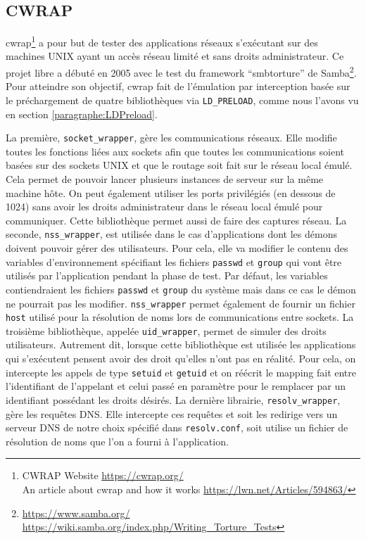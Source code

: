 \subsection{CWRAP}
\label{subsection:cwrap}

cwrap\footnote{CWRAP Website \url{https://cwrap.org/} \\ An article about cwrap and how it works \url{https://lwn.net/Articles/594863/}} a pour but de tester des applications réseaux
s'exécutant sur des machines UNIX ayant un accès réseau limité et sans droits
administrateur. Ce projet libre a débuté en 2005 avec le test du framework
``smbtorture'' de Samba\footnote{\url{https://www.samba.org/}
  \\ \url{https://wiki.samba.org/index.php/Writing\_Torture\_Tests}}. Pour
atteindre son objectif, cwrap fait de l'émulation par interception basée sur le
préchargement de quatre bibliothèques via \texttt{LD\_PRELOAD}, comme nous
l'avons vu en section \ref{paragraphe:LDPreload}.

La première, \texttt{socket\_wrapper}, gère les communications
réseaux. Elle modifie toutes les fonctions liées aux sockets afin que toutes les
communications soient basées sur des sockets UNIX et que le routage soit fait
sur le réseau local émulé. Cela permet de pouvoir lancer plusieurs instances de
serveur sur la même machine hôte. On peut également utiliser les ports
privilégiés (en dessous de 1024) sans avoir les droits administrateur dans le
réseau local émulé pour communiquer. Cette bibliothèque permet aussi de faire
des captures réseau. La seconde, \texttt{nss\_wrapper}, est
utilisée dans le cas d'applications dont les démons doivent pouvoir gérer des
utilisateurs. Pour cela, elle va modifier le contenu des variables
d'environnement spécifiant les fichiers \texttt{passwd} et \texttt{group} qui
vont être utilisés par l'application pendant la phase de test. Par défaut, les
variables contiendraient les fichiers \texttt{passwd} et \texttt{group} du
système mais dans ce cas le démon ne pourrait pas les
modifier. \texttt{nss\_wrapper} permet également de fournir un fichier
\texttt{host} utilisé pour la résolution de noms lors de communications entre
sockets. La troisième bibliothèque, appelée \texttt{uid\_wrapper},
permet de simuler des droits utilisateurs. Autrement dit, lorsque cette
bibliothèque est utilisée les applications qui s'exécutent pensent avoir des
droit qu'elles n'ont pas en réalité. Pour cela, on intercepte les appels de type
\texttt{setuid} et \texttt{getuid} et on réécrit le mapping fait entre
l'identifiant de l'appelant et celui passé en paramètre pour le remplacer par un
identifiant possédant les droits désirés. La dernière librairie,
\texttt{resolv\_wrapper}, gère les requêtes DNS. Elle intercepte
ces requêtes et soit les redirige vers un serveur DNS de notre choix spécifié
dans \texttt{resolv.conf}, soit utilise un fichier de résolution de noms que
l'on a fourni à l'application.


